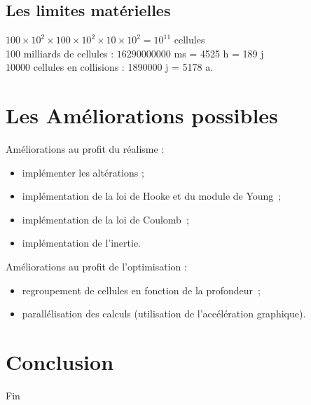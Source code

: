 \documentclass{beamer}
\begin{document}
\subsection{Les limites matérielles}
\begin{frame}
  \begin{center}
  \end{center}
  \begin{center}
  \end{center}
  $100 \times 10^2 \times 100 \times 10^2 \times 10 \times 10^2 = 10^{11}$ cellules \\
  100 milliards de cellules : $16290000000$ ms = 4525 h = 189 j\\
  $10000$ cellules en collisions : 1890000 j = 5178 a.
\end{frame}

\section{Les Améliorations possibles}
\begin{frame}
  Améliorations au profit du réalisme :
  \begin{itemize}
    \item implémenter les altérations ;
    \item implémentation de la loi de Hooke et du module de Young~;
    \item implémentation de la loi de Coulomb~;
    \item implémentation de l'inertie.
  \end{itemize}
  Améliorations au profit de l'optimisation :
  \begin{itemize}
    \item regroupement de cellules en fonction de la profondeur~;
    \item parallélisation des calculs (utilisation de l'accélération graphique).
  \end{itemize}
\end{frame}

\section{Conclusion}
\begin{frame}
 \begin{center}
  \begin{huge}
   Fin
  \end{huge} 
 \end{center}
\end{frame}
\end{document}
